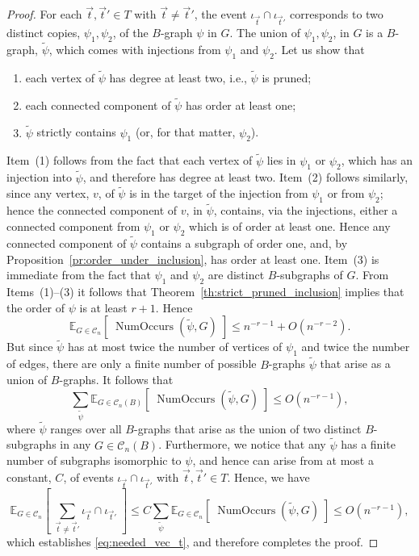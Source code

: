 \documentclass{memo-l}
\theoremstyle{plain}
\theoremstyle{definition}
\numberwithin{section}{chapter}
\numberwithin{equation}{chapter}
\newcommand{\expect}[2]{{\mathbb{E}}_{#1}{\left[\; #2\; \right]}}
\DeclareMathOperator{\NumOccurs}{NumOccurs}
\theoremstyle{plain}
\theoremstyle{definition}
\newcommand\cC{\mathcal{C}}
\begin{document}
\begin{proof}
For each $\vec t,\vec t'\in T$ with $\vec t\ne\vec t'$,
the event $\iota_{\vec t}\cap \iota_{\vec t'}$
corresponds to
two distinct copies,
$\psi_1,\psi_2$,
of the $B$-graph $\psi$ in $G$.  The union of $\psi_1,\psi_2$,
in $G$ is a $B$-graph, $\widetilde\psi$, which comes
with injections from $\psi_1$ and $\psi_2$.
Let us show that
\begin{enumerate}
\item each vertex of $\widetilde\psi$ has degree at least two,
i.e., $\widetilde\psi$ is pruned;
\item each connected component of $\widetilde\psi$ has order at
least one;
\item $\widetilde\psi$ strictly contains $\psi_1$ (or, for that
matter, $\psi_2$).
\end{enumerate}
Item~(1) follows from the fact that each vertex of $\widetilde\psi$
lies in $\psi_1$ or $\psi_2$, which has an injection into $\widetilde\psi$,
and therefore has degree at least two.
Item~(2) follows similarly, since any vertex, $v$, of $\widetilde\psi$
is in the target of the injection from $\psi_1$ or from $\psi_2$; hence
the connected component of $v$, in $\widetilde\psi$, contains, via the
injections, either a connected component from $\psi_1$ or $\psi_2$
which is of order at least one.  Hence any connected component of 
$\widetilde\psi$ contains a subgraph of order one, and,
by Proposition~\ref{pr:order_under_inclusion}, has order at least one.
Item~(3) is immediate from the fact that $\psi_1$ and $\psi_2$
are distinct $B$-subgraphs of $G$.
From Items~(1)--(3) it follows that Theorem~\ref{th:strict_pruned_inclusion}
implies that the order of $\psi$ is at least $r+1$.  Hence
$$
\expect{G\in\cC_n}{\NumOccurs(\widetilde\psi,G) } \le
n^{-r-1} + O(n^{-r-2}).
$$
But since $\widetilde\psi$ has at most twice the number of vertices of $\psi_1$
and twice the number of edges, there are only a finite number of
possible $B$-graphs $\widetilde\psi$ that arise as a union of $B$-graphs.
It follows that
$$
\sum_{\widetilde\psi} \expect{G\in\cC_n(B)}{\NumOccurs(\widetilde\psi,G)}
\le O(n^{-r-1}),
$$
where $\widetilde\psi$ ranges over all $B$-graphs that arise as the
union of two distinct $B$-subgraphs in any $G\in\cC_n(B)$.
Furthermore, we notice that any $\widetilde\psi$ has a finite number
of subgraphs isomorphic to $\psi$, and hence can arise from at most
a constant, $C$, of events $\iota_{\vec t}\cap\iota_{\vec t'}$ with
$\vec t,\vec t'\in T$.
Hence, we have
$$
\expect{G\in\cC_n}{\sum_{\vec t\ne \vec t'} \iota_{\vec t}\cap\iota_{\vec t'}}
\le
C
\sum_{\widetilde\psi}
\expect{G\in\cC_n}{\NumOccurs(\widetilde\psi,G) } \le
O(n^{-r-1}) ,
$$
which establishes \eqref{eq:needed_vec_t}, and therefore completes
the proof.
\end{proof}
\end{document}
